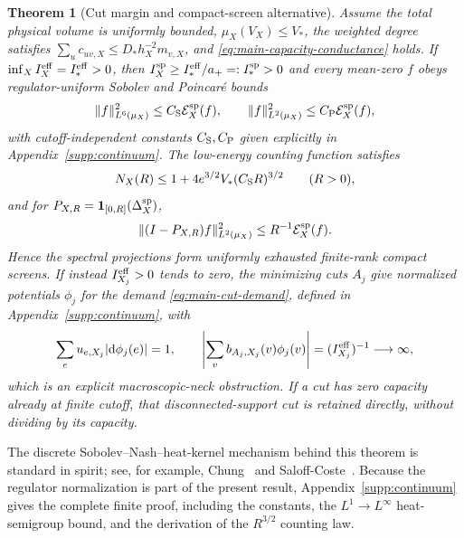 \documentclass[11pt]{article}
\newtheorem{theorem}{Theorem}[section]
\numberwithin{equation}{section}
\theoremstyle{definition}
\theoremstyle{remark}
\newcommand{\one}{\mathbf 1}
\newcommand{\dd}{\mathrm d}
\begin{document}
\begin{theorem}[Cut margin and compact-screen alternative]
\label{thm:main-spatial-screen}
Assume the total physical volume is uniformly bounded,
$\mu_X(V_X)\le V_*$, the weighted degree satisfies
$\sum_uc_{uv,X}\le D_*h_X^{-2}m_{v,X}$, and
\eqref{eq:main-capacity-conductance} holds.  If
$\inf_X I_X^{\rm eff}=I_*^{\rm eff}>0$, then
$I_X^{\rm sp}\ge I_*^{\rm eff}/a_+=:I_*^{\rm sp}>0$ and every mean-zero $f$
obeys regulator-uniform Sobolev and Poincar\'e bounds
\begin{equation}
 \|f\|_{L^6(\mu_X)}^2\le C_{\rm S}\mathcal E_X^{\rm sp}(f),
 \qquad
 \|f\|_{L^2(\mu_X)}^2\le C_{\rm P}\mathcal E_X^{\rm sp}(f),
 \label{eq:main-sobolev-poincare}
\end{equation}
with cutoff-independent constants $C_{\rm S},C_{\rm P}$ given explicitly in
Appendix~\ref{supp:continuum}.
The low-energy counting function satisfies
\begin{equation}
 N_X(R)\le1+4e^{3/2}V_*(C_{\rm S}R)^{3/2}
 \qquad(R>0),
 \label{eq:main-weyl-count}
\end{equation}
and for $P_{X,R}=\one_{[0,R]}(\Delta_X^{\rm sp})$,
\begin{equation}
 \|(I-P_{X,R})f\|_{L^2(\mu_X)}^2
 \le R^{-1}\mathcal E_X^{\rm sp}(f).
 \label{eq:main-screen-tail}
\end{equation}
Hence the spectral projections form uniformly exhausted finite-rank compact
screens.  If instead $I_{X_j}^{\rm eff}>0$ tends to zero, the minimizing
cuts $A_j$ give normalized potentials $\phi_j$ for the demand
\eqref{eq:main-cut-demand}, defined in Appendix~\ref{supp:continuum}, with
\begin{equation}
 \sum_eu_{e,X_j}|\dd\phi_j(e)|=1,
 \qquad
 \left|\sum_v b_{A_j,X_j}(v)\phi_j(v)\right|
 =(I_{X_j}^{\rm eff})^{-1}\longrightarrow\infty,
 \label{eq:main-neck-obstruction}
\end{equation}
which is an explicit macroscopic-neck obstruction.  If a cut has zero
capacity already at finite cutoff, that disconnected-support cut is retained
directly, without dividing by its capacity.
\end{theorem}

The discrete Sobolev--Nash--heat-kernel mechanism behind this theorem is
standard in spirit; see, for example, Chung~\cite[Chs.~10--11]{Chung1997} and
Saloff-Coste~\cite{SaloffCoste2002}.  Because the regulator normalization is
part of the present result, Appendix~\ref{supp:continuum} gives the complete
finite proof, including the constants, the $L^1\!\to L^\infty$ heat-semigroup
bound, and the derivation of the $R^{3/2}$ counting law.
\end{document}
